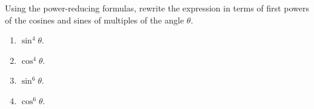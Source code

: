 Using the power-reducing formulas, rewrite the expression in terms of first powers of the cosines and sines of multiples of the  angle $\theta$.\\


\begin{enumerate}[ref={\fcProblemRef}]
\item $\sin^4\theta$.

\item $\cos^4\theta$.


\item \label{problemExpresssin^6xviaTrigFunctionsMultipleAngle} $\sin^6\theta$.


\item \label{problemExpresscos^6xviaTrigFunctionsMultipleAngle} $\cos^6\theta$.

\end{enumerate}
